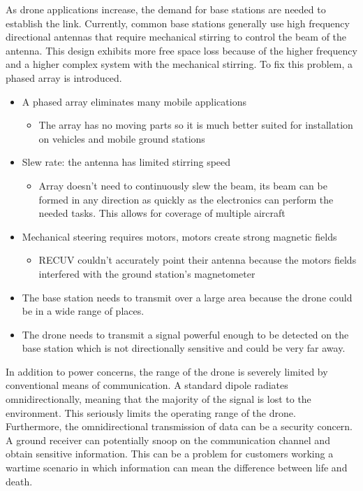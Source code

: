 \documentclass[11pt]{article}
\numberwithin{figure}{section}
\begin{document}
	As drone applications increase, the demand for base stations are needed to establish the link. Currently, common base stations generally use high frequency directional antennas that require mechanical stirring to control the beam of the antenna. This design exhibits more free space loss because of the higher frequency and a higher complex system with the mechanical stirring. To fix this problem, a phased array is introduced. 
	\begin{itemize}
		\item A phased array eliminates many mobile applications
		\begin{itemize}
			\item The array has no moving parts so it is much better suited for installation on vehicles and mobile ground stations
		\end{itemize}
		\item Slew rate: the antenna has limited stirring speed
		\begin{itemize}
			\item Array doesn’t need to continuously slew the beam, its beam can be formed in any direction as quickly as the electronics can perform the needed tasks. This allows for coverage of multiple aircraft
		\end{itemize}
		\item Mechanical steering requires motors, motors create strong magnetic fields
		\begin{itemize}
			\item RECUV couldn’t accurately point their antenna because the motors fields interfered with the ground station’s magnetometer
		\end{itemize}

		\item The base station needs to transmit over a large area because the drone could be in a wide range of places.
		\item The drone needs to transmit a signal powerful enough to be detected on the base station which is not directionally sensitive and could be very far away.
	\end{itemize}

	
	In addition to power concerns, the range of the drone is severely limited by conventional means of communication.  A standard dipole radiates omnidirectionally, meaning that the majority of the signal is lost to the environment.  This seriously limits the operating range of the drone.  \\
	
	Furthermore, the omnidirectional transmission of data can be a security concern.  A ground receiver can potentially snoop on the communication channel and obtain sensitive information.  This can be a problem for customers working a wartime scenario in which information can mean the difference between life and death.  \\
\end{document}
